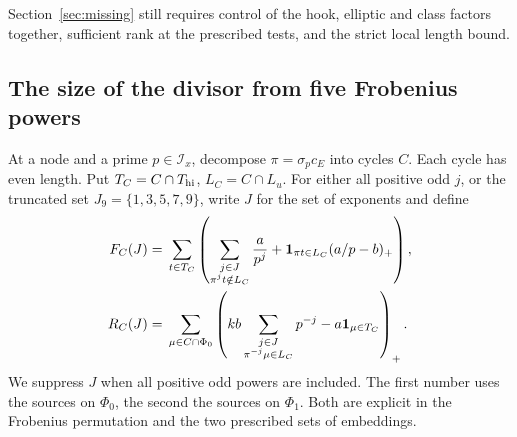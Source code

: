 \documentclass[a4paper,11pt]{article}
\theoremstyle{definition}
\theoremstyle{remark}
\numberwithin{equation}{section}
\begin{document}
Section~\ref{sec:missing} still requires control of the hook,
elliptic and class factors together, sufficient rank at the
prescribed tests, and the strict local length bound.





\subsection{The size of the divisor from five Frobenius powers}
\label{sec:middlerangedivisor674}

At a node and a prime \(p\in\mathcal I_x\), decompose
\(\pi=\sigma_pc_E\) into cycles \(C\). Each cycle has even
length. Put \(T_C=C\cap T_{\rm hi}\), \(L_C=C\cap L_u\).
For either all positive odd \(j\), or the truncated set
\(J_9=\{1,3,5,7,9\}\), write \(J\) for the set of exponents
and define
\[
\begin{split}
 F_C(J)={}&\sum_{t\in T_C}
 \left(\sum_{\substack{j\in J\\ \pi^jt\notin L_C}}\frac{a}{p^j}
       +{\bf1}_{\pi t\in L_C}(a/p-b)_+\right),\\
 R_C(J)={}&\sum_{\mu\in C\cap\Phi_0}
  \left(kb\sum_{\substack{j\in J\\ \pi^{-j}\mu\in L_C}}p^{-j}
                                  -a{\bf1}_{\mu\in T_C}\right)_+ .
\end{split}
\]
We suppress \(J\) when all positive odd powers are included.
The first number uses the sources on \(\Phi_0\), the second
the sources on \(\Phi_1\). Both are explicit in the Frobenius
permutation and the two prescribed sets of embeddings.
\end{document}
